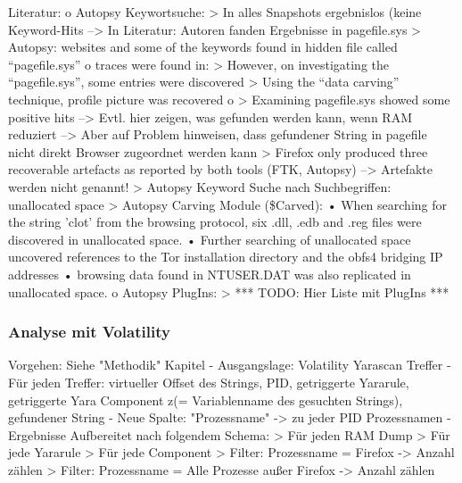 Literatur:
	o	Autopsy Keywortsuche: 
		>	In alles Snapshots ergebnislos (keine Keyword-Hits
		-->	In Literatur: Autoren fanden Ergebnisse in pagefile.sys 
			> Autopsy: websites and some of the keywords found in hidden file called “pagefile.sys” \cite{Mahlous.2020}
			o \cite{Montasari.2015} traces were found in: 
				> However, on investigating the “pagefile.sys”, some entries were discovered
				> Using the “data carving” technique, profile picture was recovered
			o \cite{Said.2011} 
				> Examining pagefile.sys showed some positive hits 			
		--> Evtl. hier zeigen, was gefunden werden kann, wenn RAM reduziert
		--> Aber auf Problem hinweisen, dass gefundener String in pagefile nicht direkt Browser zugeordnet werden kann
		> \cite{Gabet.2018}	Firefox only produced three recoverable artefacts as reported by both tools (FTK, Autopsy) --> Artefakte werden nicht genannt!
		> \cite{Muir.2019} Autopsy Keyword Suche nach Suchbegriffen: unallocated space
		> Autopsy Carving Module (\$Carved): \cite{Muir.2019}
			•	When searching for the string ’clot’ from the browsing protocol, six .dll, .edb and .reg files were discovered in unallocated space.
			•	Further searching of unallocated space uncovered references to the Tor installation directory and the obfs4 bridging IP addresses
			•	browsing data found in NTUSER.DAT was also replicated in unallocated space.
	o	Autopsy PlugIns:
		>	*** TODO: Hier Liste mit PlugIns ***

\subsubsection*{Analyse mit Volatility}
Vorgehen: Siehe "Methodik" Kapitel
	- Ausgangslage: Volatility Yarascan Treffer
	- Für jeden Treffer: virtueller Offset des Strings, PID, getriggerte Yararule, getriggerte Yara Component z(= Variablenname des gesuchten Strings), gefundener String
	- Neue Spalte: "Prozessname" -> zu jeder PID Prozessnamen
	- Ergebnisse Aufbereitet nach folgendem Schema:
		> Für jeden RAM Dump
		> Für jede Yararule
		> Für jede Component
		> Filter: Prozessname = Firefox -> Anzahl zählen
		> Filter: Prozessname = Alle Prozesse außer Firefox -> Anzahl zählen


